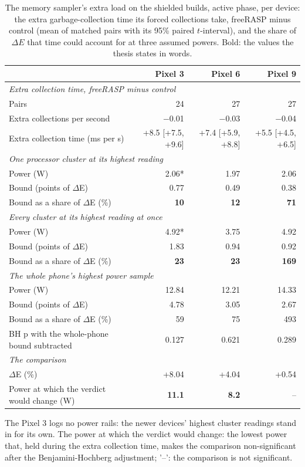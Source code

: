 \begin{table}[t]
\centering
\small
\caption{The memory sampler's extra load on the shielded builds, active phase, per device: the extra garbage-collection time its forced collections take, freeRASP minus control (mean of matched pairs with its 95\% paired $t$-interval), and the share of $\Delta E$ that time could account for at three assumed powers. Bold: the values the thesis states in words.}
\label{tab:sampler-load}
\begin{tabular}{lrrr}
\toprule
\textbf{} & \textbf{Pixel 3} & \textbf{Pixel 6} & \textbf{Pixel 9} \\
\midrule
\multicolumn{4}{l}{\textit{Extra collection time, freeRASP minus control}} \\
Pairs & 24 & 27 & 27 \\
Extra collections per second & $-$0.01 & $-$0.03 & $-$0.04 \\
Extra collection time (ms per s) & +8.5 [+7.5, +9.6] & +7.4 [+5.9, +8.8] & +5.5 [+4.5, +6.5] \\
\midrule
\multicolumn{4}{l}{\textit{One processor cluster at its highest reading}} \\
Power (W) & 2.06* & 1.97 & 2.06 \\
Bound (points of $\Delta$E) & 0.77 & 0.49 & 0.38 \\
Bound as a share of $\Delta$E (\%) & \textbf{10} & \textbf{12} & \textbf{71} \\
\midrule
\multicolumn{4}{l}{\textit{Every cluster at its highest reading at once}} \\
Power (W) & 4.92* & 3.75 & 4.92 \\
Bound (points of $\Delta$E) & 1.83 & 0.94 & 0.92 \\
Bound as a share of $\Delta$E (\%) & \textbf{23} & \textbf{23} & \textbf{169} \\
\midrule
\multicolumn{4}{l}{\textit{The whole phone's highest power sample}} \\
Power (W) & 12.84 & 12.21 & 14.33 \\
Bound (points of $\Delta$E) & 4.78 & 3.05 & 2.67 \\
Bound as a share of $\Delta$E (\%) & 59 & 75 & 493 \\
BH p with the whole-phone bound subtracted & 0.127 & 0.621 & 0.289 \\
\midrule
\multicolumn{4}{l}{\textit{The comparison}} \\
$\Delta$E (\%) & +8.04 & +4.04 & +0.54 \\
Power at which the verdict would change (W) & \textbf{11.1} & \textbf{8.2} & – \\
\bottomrule
\end{tabular}
\par\smallskip\footnotesize * The Pixel 3 logs no power rails: the newer devices' highest cluster readings stand in for its own. The power at which the verdict would change: the lowest power that, held during the extra collection time, makes the comparison non-significant after the Benjamini-Hochberg adjustment; '–': the comparison is not significant.
\end{table}
